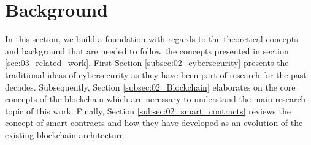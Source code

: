 \section{Background}
\label{sec:02_background}

In this section, we build a foundation with regards to the theoretical concepts and background that are needed to follow the concepts presented in section \ref{sec:03_related_work}. First Section \ref{subsec:02_cybersecurity} presents the traditional ideas of cybersecurity as they have been part of research for the past decades. Subsequently, Section \ref{subsec:02_Blockchain} elaborates on the core concepts of the blockchain which are necessary to understand the main research topic of this work. Finally, Section \ref{subsec:02_smart_contracts} reviews the concept of smart contracts and how they have developed as an evolution of the existing blockchain architecture.




